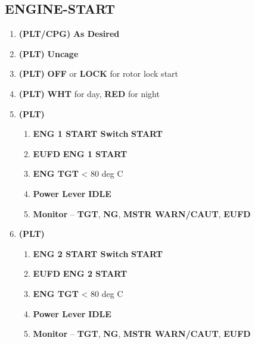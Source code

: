 \documentclass[fontHelvetica]{TechCheck}
\begin{document}
	\subsection{ENGINE-START}
	\begin{enumerate}[leftmargin=0.1\linewidth,rightmargin=0.1\linewidth, itemsep=4pt]
		\item {} \textbf{(PLT/CPG)} \dotfill \textbf{As Desired}
		\item {} \textbf{(PLT)} \dotfill \textbf{Uncage}
		\item {} \textbf{(PLT)} \dotfill \textbf{OFF}  or \textbf{LOCK} for rotor lock start
		\item {} \textbf{(PLT)} \dotfill \textbf{WHT} for day, \textbf{RED} for night 
		\item {} \textbf{(PLT)}
		\begin{enumerate}[itemsep=4pt]
			\item \textbf{ENG 1 START Switch} \dotfill \textbf{START}
			\item \textbf{EUFD} \dotfill \textbf{ENG 1 START}
			\item \textbf{ENG TGT} \dotfill < 80 deg C
			\item \textbf{Power Lever} \dotfill \textbf{IDLE}
			\item \textbf{Monitor} -- \textbf{TGT}, \textbf{NG}, \textbf{MSTR WARN/CAUT}, \textbf{EUFD}
		\end{enumerate}
		\item {} \textbf{(PLT)}
		\begin{enumerate}[itemsep=4pt]
			\item \textbf{ENG 2 START Switch} \dotfill \textbf{START}
			\item \textbf{EUFD} \dotfill \textbf{ENG 2 START}
			\item \textbf{ENG TGT} \dotfill < 80 deg C
			\item \textbf{Power Lever} \dotfill \textbf{IDLE}
			\item \textbf{Monitor} -- \textbf{TGT}, \textbf{NG}, \textbf{MSTR WARN/CAUT}, \textbf{EUFD}

\end{enumerate}
\end{enumerate}
\end{document}

